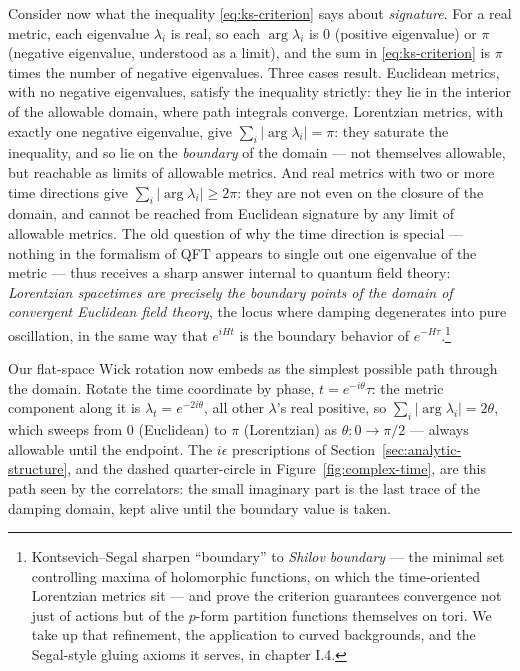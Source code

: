 \noin Consider now what the inequality \eqref{eq:ks-criterion} says about
\emph{signature}. For a real metric, each eigenvalue $\lambda_i$ is real, so
each $\arg\lambda_i$ is $0$ (positive eigenvalue) or $\pi$ (negative
eigenvalue, understood as a limit), and the sum in \eqref{eq:ks-criterion}
is $\pi$ times the number of negative eigenvalues. Three cases result.
Euclidean metrics, with no negative eigenvalues, satisfy the inequality
strictly: they lie in the interior of the allowable domain, where path
integrals converge. Lorentzian metrics, with exactly one negative
eigenvalue, give $\sum_i|\arg\lambda_i| = \pi$: they saturate the
inequality, and so lie on the \emph{boundary} of the domain --- not
themselves allowable, but reachable as limits of allowable metrics. And
real metrics with two or more time directions give $\sum_i |\arg\lambda_i|
\ge 2\pi$: they are not even on the closure of the domain, and cannot be
reached from Euclidean signature by any limit of allowable metrics. The
old question of why the time direction is special --- nothing in the
formalism of QFT appears to single out one eigenvalue of the metric ---
thus receives a sharp answer internal to quantum field theory:
\emph{Lorentzian spacetimes are precisely the boundary points of the domain
of convergent Euclidean field theory}, the locus where damping degenerates
into pure oscillation, in the same way that $e^{iHt}$ is the boundary
behavior of $e^{-H\tau}$.\footnote{Kontsevich--Segal sharpen ``boundary'' to
\emph{Shilov boundary} --- the minimal set controlling maxima of holomorphic
functions, on which the time-oriented Lorentzian metrics sit --- and prove
the criterion guarantees convergence not just of actions but of the
$p$-form partition functions themselves on tori. We take up that refinement,
the application to curved backgrounds, and the Segal-style gluing axioms it
serves, in chapter I.4.}

Our flat-space Wick rotation now embeds as the simplest possible path through
the domain. Rotate the time coordinate by phase, $t = e^{-i\theta}\tau$: the
metric component along it is $\lambda_t = e^{-2i\theta}$, all other
$\lambda$'s real positive, so $\sum_i|\arg\lambda_i| = 2\theta$, which sweeps
from $0$ (Euclidean) to $\pi$ (Lorentzian) as $\theta\colon 0 \to \pi/2$ ---
always allowable until the endpoint. The $i\epsilon$ prescriptions of
Section~\ref{sec:analytic-structure}, and the dashed quarter-circle in
Figure~\ref{fig:complex-time}, are this path seen by the correlators: the
small imaginary part is the last trace of the damping domain, kept alive until
the boundary value is taken.

